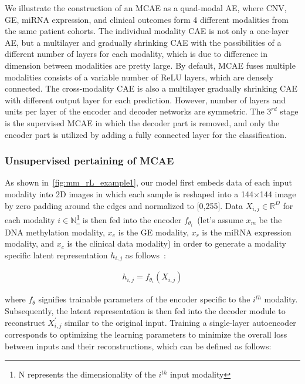 \hspace*{3.5mm} We illustrate the construction of an MCAE as a quad-modal AE, where CNV, GE, miRNA expression, and clinical outcomes form 4 different modalities from the same patient cohorts. The individual modality CAE is not only a one-layer AE, but a multilayer and gradually shrinking CAE with the possibilities of a different number of layers for each modality, which is due to difference in dimension between modalities are pretty large. By default, MCAE fuses multiple modalities consists of a variable number of ReLU layers, which are densely connected. The cross-modality CAE is also a multilayer gradually shrinking CAE with different output layer for each prediction. However, number of layers and units per layer of the encoder and decoder networks are symmetric. The $3^{rd}$ stage is the supervised MCAE in which the decoder part is removed, and only the encoder part is utilized by adding a fully connected layer for the classification. %

\subsubsection{Unsupervised pertaining of MCAE}
As shown in~\cref{fig:mm_rL_example1}, our model first embeds data of each input modality into 2D images in which each sample is reshaped into a 144$\times$144 image by zero padding around the edges and normalized to [0,255]. 
Data $X_{i,j} \in \mathbb{R}^{D}$ for each modality $i \in \mathbb{N}$\footnote{N represents the dimensionality of the $i^{th}$ input modality} is then fed into the encoder $f_{\theta_{i}}$~(let's assume $x_m$ be the DNA methylation modality, $x_e$ is the GE modality, $x_r$ is the miRNA expression modality, and $x_c$ is the clinical data modality) in order to generate a modality specific latent representation $h_{i, j}$ as follows~\cite{mmdcae}: 

\vspace{-6mm}
\begin{align}
    h_{i,j}=f_{\theta_{i}}\left({X}_{i, j}\right)
\end{align}

\hspace*{3.5mm} where $f_\theta$ signifies trainable parameters of the encoder specific to the $i^{th}$ modality. Subsequently, the latent representation is then fed into the decoder module to reconstruct ${X}_{i, j}^{\prime}$ similar to the original input. 
Training a single-layer autoencoder corresponds to optimizing the learning parameters to minimize the overall loss between inputs and their reconstructions, which can be defined as follows:

